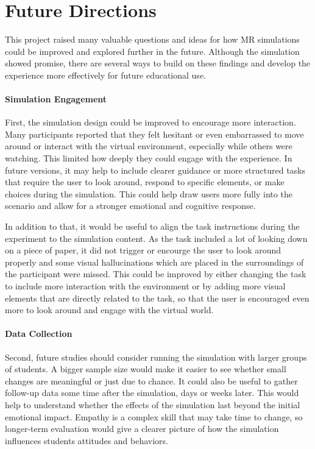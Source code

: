 \section{Future Directions}

This project raised many valuable questions and ideas for how MR simulations could be improved and explored further in the future. Although the simulation showed promise, there are several ways to build on these findings and develop the experience more effectively for future educational use.

\paragraph{Simulation Engagement} First, the simulation design could be improved to encourage more interaction. Many participants reported that they felt hesitant or even embarrassed to move around or interact with the virtual environment, especially while others were watching. This limited how deeply they could engage with the experience. In future versions, it may help to include clearer guidance or more structured tasks that require the user to look around, respond to specific elements, or make choices during the simulation. This could help draw users more fully into the scenario and allow for a stronger emotional and cognitive response.

\vspace{1em}

In addition to that, it would be useful to align the task instructions during the experiment to the simulation content. As the task included a lot of looking down on a piece of paper, it did not trigger or encourge the user to look around properly and some visual hallucinations which are placed in the surroundings of the participant were missed. This could be improved by either changing the task to include more interaction with the environment or by adding more visual elements that are directly related to the task, so that the user is encouraged even more to look around and engage with the virtual world.

\paragraph{Data Collection} Second, future studies should consider running the simulation with larger groups of students. A bigger sample size would make it easier to see whether small changes are meaningful or just due to chance. It could also be useful to gather follow-up data some time after the simulation, days or weeks later. This would help to understand whether the effects of the simulation last beyond the initial emotional impact. Empathy is a complex skill that may take time to change, so longer-term evaluation would give a clearer picture of how the simulation influences students attitudes and behaviors.

